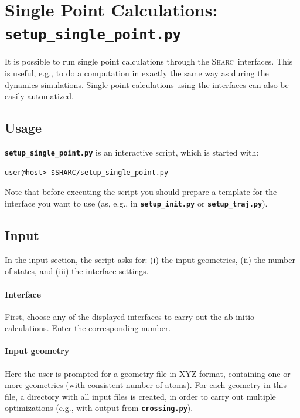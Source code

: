 \documentclass[a4paper,10pt,DIV=15,openany]{scrbook}
\newcommand{\sharc}{\textsc{Sharc}}
\newcommand{\ttt}[1]{\textbf{\texttt{#1}}}
\begin{document}

\section{Single Point Calculations: \ttt{setup\_single\_point.py}}\label{sec:setup_single_point.py}

It is possible to run single point calculations through the \sharc\ interfaces.
This is useful, e.g., to do a computation in exactly the same way as during the dynamics simulations.
Single point calculations using the interfaces can also be easily automatized.


\subsection{Usage}

\ttt{setup\_single\_point.py} is an interactive script, which is started with:
\begin{verbatim}
user@host> $SHARC/setup_single_point.py
\end{verbatim}
Note that before executing the script you should prepare a template for the interface you want to use (as, e.g., in \ttt{setup\_init.py} or \ttt{setup\_traj.py}).

\subsection{Input}

In the input section, the script asks for: (i) the input geometries, (ii) the number of states, and (iii) the interface settings.

\paragraph{Interface}

First, choose any of the displayed interfaces to carry out the ab initio calculations. Enter the corresponding number. 

\paragraph{Input geometry}

Here the user is prompted for a geometry file in XYZ format, containing one or more geometries (with consistent number of atoms).
For each geometry in this file, a directory with all input files is created, in order to carry out multiple optimizations (e.g., with output from \ttt{crossing.py}).
\end{document}
